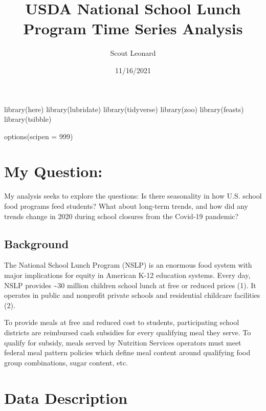 \documentclass[
]{article}
\title{USDA National School Lunch Program Time Series Analysis}
\author{Scout Leonard}
\date{11/16/2021}
\newenvironment{Shaded}{\begin{snugshade}}{\end{snugshade}}
\newcommand{\AttributeTok}[1]{\textcolor[rgb]{0.77,0.63,0.00}{#1}}
\newcommand{\DecValTok}[1]{\textcolor[rgb]{0.00,0.00,0.81}{#1}}
\newcommand{\FunctionTok}[1]{\textcolor[rgb]{0.00,0.00,0.00}{#1}}
\newcommand{\NormalTok}[1]{#1}
\begin{document}
\maketitle

\begin{Shaded}
\begin{Highlighting}[]
\FunctionTok{library}\NormalTok{(here)}
\FunctionTok{library}\NormalTok{(lubridate)}
\FunctionTok{library}\NormalTok{(tidyverse)}
\FunctionTok{library}\NormalTok{(zoo)}
\FunctionTok{library}\NormalTok{(feasts)}
\FunctionTok{library}\NormalTok{(tsibble)}

\FunctionTok{options}\NormalTok{(}\AttributeTok{scipen =} \DecValTok{999}\NormalTok{)}
\end{Highlighting}
\end{Shaded}

\hypertarget{my-question}{%
\section{My Question:}\label{my-question}}

My analysis seeks to explore the questions: Is there seasonality in how
U.S. school food programs feed students? What about long-term trends,
and how did any trends change in 2020 during school closures from the
Covid-19 pandemic?

\hypertarget{background}{%
\subsection{Background}\label{background}}

The National School Lunch Program (NSLP) is an enormous food system with
major implications for equity in American K-12 education systems. Every
day, NSLP provides \textasciitilde30 million children school lunch at
free or reduced prices (1). It operates in public and nonprofit private
schools and residential childcare facilities (2).

To provide meals at free and reduced cost to students, participating
school districts are reimbursed cash subsidies for every qualifying meal
they serve. To qualify for subsidy, meals served by Nutrition Services
operators must meet federal meal pattern policies which define meal
content around qualifying food group combinations, sugar content, etc.

\hypertarget{data-description}{%
\section{Data Description}\label{data-description}}
\end{document}
